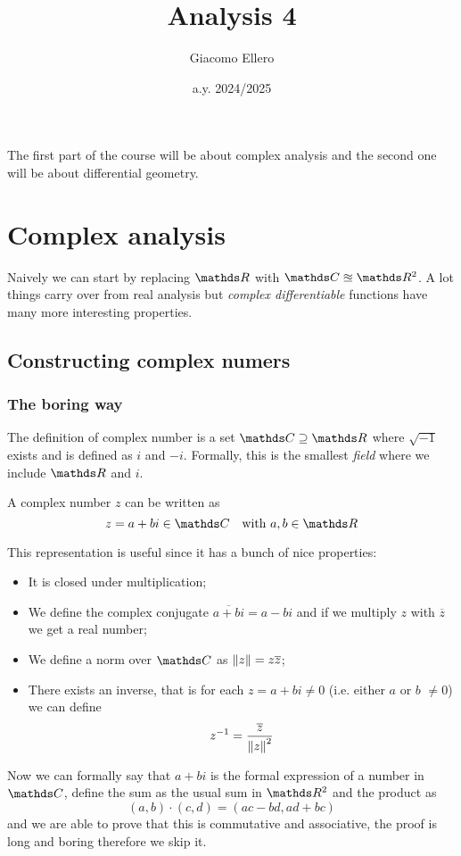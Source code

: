\documentclass[12pt]{extarticle}
\title{Analysis 4}
\author{Giacomo Ellero}
\date{a.y. 2024/2025}
\begin{document}
\oldfirstpage

The first part of the course will be about complex analysis and the second one will be about
differential geometry.

\section{Complex analysis}

Naively we can start by replacing $\R$ with $\C \approxeq \R^2$.
A lot things carry over from real analysis but \emph{complex differentiable} functions have
many more interesting properties.

\subsection{Constructing complex numers}

\subsubsection{The boring way}
The  definition of complex number is a set $\C \supseteq \R$ where $\sqrt{-1}$ exists
and is defined as $i$ and $-i$.
Formally, this is the smallest \emph{field} where we include $\R$ and $i$.

A complex number $z$ can be written as
\begin{equation}
	z = a + bi \in \C \quad \text{with } a, b \in \R
\end{equation}

This representation is useful since it has a bunch of nice properties:
\begin{itemize}
	\item It is closed under multiplication;
	\item We define the complex conjugate $\overline{a + bi} = a - bi$ and
	      if we multiply $z$ with $\overline z$ we get a real number;
	\item We define a norm over $\C$ as $\norm{z} = z \overline z$;
	\item There exists an inverse, that is for each $z = a + bi \neq 0$
	      (i.e. either $a$ or $b$ $\neq 0$) we can define
	      \begin{equation}
		      z^{-1} = \frac{\overline z}{\norm{z}^2}
	      \end{equation}
\end{itemize}

Now we can formally say that $a + bi$ is the formal expression of a number in $\C$,
define the sum as the usual sum in $\R^2$ and the product as
\begin{equation}
	(a, b) \cdot (c, d) = (ac - bd, ad + bc)
\end{equation}
and we are able to prove that this is commutative and associative,
the proof is long and boring therefore we skip it.
\end{document}
